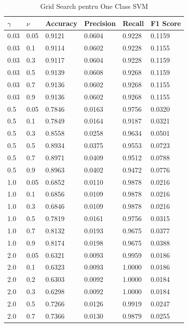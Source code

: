 \begin{table}[H]
  \centering
  \begin{tabularx}{\textwidth}{
      |X
      |X
      |X
      |X
      |X
      |X|
  }
  \hline
  $\gamma$ & $\nu$ & {Accuracy} & {Precision} & {Recall} & {F1 Score} \\
  \hline
  \rowcolor{gray!20} 0.03 & 0.05 & 0.9121 & 0.0604 & 0.9228 & 0.1159 \\
  0.03 & 0.1 & 0.9114 & 0.0602 & 0.9228 & 0.1155 \\
  \rowcolor{gray!20} 0.03 & 0.3 & 0.9117 & 0.0604 & 0.9228 & 0.1159 \\
  0.03 & 0.5 & 0.9139 & 0.0608 & 0.9268 & 0.1159 \\
  \rowcolor{gray!20} 0.03 & 0.7 & 0.9136 & 0.0602 & 0.9268 & 0.1155 \\
  0.03 & 0.9 & 0.9136 & 0.0602 & 0.9268 & 0.1155 \\
  \hline
  \rowcolor{gray!20} 0.5 & 0.05 & 0.7846 & 0.0163 & 0.9756 & 0.0320 \\
  0.5 & 0.1 & 0.7849 & 0.0164 & 0.9187 & 0.0321 \\
  \rowcolor{gray!20} 0.5 & 0.3 & 0.8558 & 0.0258 & 0.9634 & 0.0501 \\
  0.5 & 0.5 & 0.8934 & 0.0375 & 0.9553 & 0.0723 \\
  \rowcolor{gray!20} 0.5 & 0.7 & 0.8971 & 0.0409 & 0.9512 & 0.0788 \\
  0.5 & 0.9 & 0.8963 & 0.0402 & 0.9472 & 0.0776 \\
  \hline
  \rowcolor{gray!20} 1.0 & 0.05 & 0.6852 & 0.0110 & 0.9878 & 0.0216 \\
  1.0 & 0.1 & 0.6856 & 0.0109 & 0.9878 & 0.0216 \\
  \rowcolor{gray!20} 1.0 & 0.3 & 0.6846 & 0.0109 & 0.9878 & 0.0216 \\
  1.0 & 0.5 & 0.7819 & 0.0161 & 0.9756 & 0.0315 \\
  \rowcolor{gray!20} 1.0 & 0.7 & 0.8132 & 0.0193 & 0.9675 & 0.0377 \\
  1.0 & 0.9 & 0.8174 & 0.0198 & 0.9675 & 0.0388 \\
  \hline
  \rowcolor{gray!20} 2.0 & 0.05 & 0.6321 & 0.0093 & 0.9959 & 0.0186 \\
  2.0 & 0.1 & 0.6323 & 0.0093 & 1.0000 & 0.0186 \\
  \rowcolor{gray!20} 2.0 & 0.2 & 0.6303 & 0.0092 & 1.0000 & 0.0184 \\
  2.0 & 0.3 & 0.6298 & 0.0092 & 1.0000 & 0.0184 \\
  \rowcolor{gray!20} 2.0 & 0.5 & 0.7266 & 0.0126 & 0.9919 & 0.0247 \\
  2.0 & 0.7 & 0.7366 & 0.0130 & 0.9879 & 0.0255 \\
  \hline
  \end{tabularx}
  \caption{Grid Search pentru One Class SVM}
\end{table}

